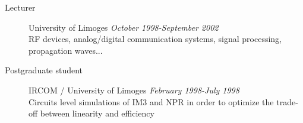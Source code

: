 \documentclass[margin,line]{resume}
\begin{document}
\begin{resume}
\begin{description}
      \item[Lecturer]\small{University of Limoges \hfill
        \textsl{October 1998-September 2002}}\\
        RF devices, analog/digital communication systems, signal
        processing, propagation waves...
        \vspace{2mm}

      \item[Postgraduate student]\small{IRCOM / University of Limoges
        \hfill \textsl{February 1998-July 1998}}\\
        Circuits level simulations of IM3 and NPR in order to
        optimize the trade-off between linearity and efficiency

    \end{description}

  \end{resume}
  
\end{document}
